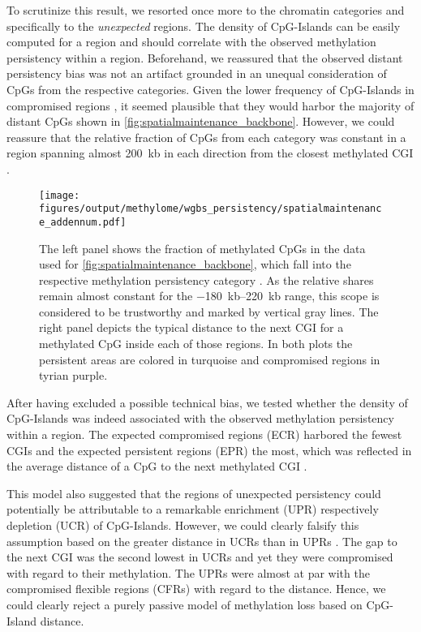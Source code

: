 To scrutinize this result, we resorted once more to the chromatin categories and specifically to the \emph{unexpected} regions. The density of CpG-Islands can be easily computed for a region and should correlate with the observed methylation persistency within a region. Beforehand, we reassured that the observed distant persistency bias was not an artifact grounded in an unequal consideration of CpGs from the respective categories. Given the lower frequency of CpG-Islands in compromised regions , it seemed plausible that they would harbor the majority of distant CpGs shown in \autoref{fig:spatialmaintenance_backbone}. However, we could reassure that the relative fraction of CpGs from each category was constant in a region spanning almost \SI{200}{\kilo b} in each direction from the closest methylated CGI 	. 

\begin{figure}[!ht]
	\centering
	\texttt{[image: figures/output/methylome/wgbs\_persistency/spatialmaintenance\_addennum.pdf]}
	\caption{The left panel shows the fraction of methylated CpGs in the data used for \autoref{fig:spatialmaintenance_backbone}, which fall into the respective methylation persistency category  . As the relative shares remain almost constant for the \SIrange{-180}{220}{\kilo b} range, this scope is considered to be trustworthy and marked by vertical gray lines. The right panel depicts the typical distance to the next CGI for a methylated CpG inside each of those regions. In both plots the persistent areas are colored in turquoise and compromised regions in tyrian purple.}
	\label{fig:spatialmaintenance_addennum}
\end{figure}

After having excluded a possible technical bias, we tested whether  the density of CpG-Islands was indeed associated with the observed methylation persistency within a region. The expected compromised regions (ECR) harbored the fewest CGIs and the expected persistent regions (EPR) the most, which was reflected in the average distance of a CpG to the next methylated CGI . 

This model also suggested that the regions of unexpected persistency could potentially be attributable to a remarkable enrichment (UPR) respectively depletion (UCR) of CpG-Islands. However, we could clearly falsify this assumption based on the greater distance in UCRs than in UPRs . The gap to the next CGI was the second lowest in UCRs and yet they were compromised with regard to their methylation. The UPRs were almost at par with the compromised flexible regions (CFRs) with regard to the distance. Hence, we could clearly reject a purely passive model of methylation loss based on CpG-Island distance. 

